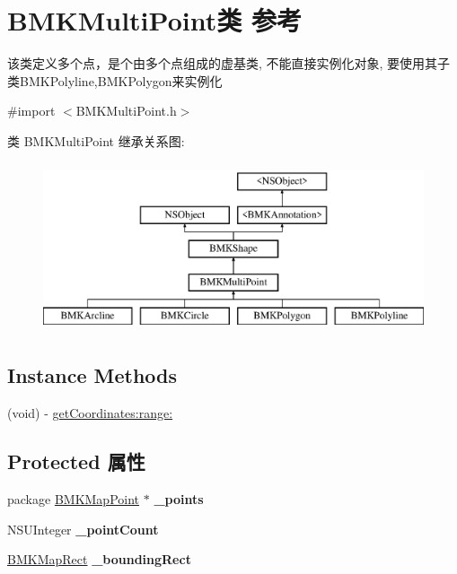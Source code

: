 \hypertarget{interface_b_m_k_multi_point}{\section{B\+M\+K\+Multi\+Point类 参考}
\label{interface_b_m_k_multi_point}
}


该类定义多个点，是个由多个点组成的虚基类, 不能直接实例化对象, 要使用其子类\+B\+M\+K\+Polyline,B\+M\+K\+Polygon来实例化  




{\ttfamily \#import $<$B\+M\+K\+Multi\+Point.\+h$>$}

类 B\+M\+K\+Multi\+Point 继承关系图\+:\begin{figure}[H]
\begin{center}
\leavevmode
\includegraphics[height=5.000000cm]{interface_b_m_k_multi_point}
\end{center}
\end{figure}
\subsection*{Instance Methods}
\begin{DoxyCompactItemize}
\item 
(void) -\/ \hyperlink{interface_b_m_k_multi_point_a5d7b000029db5c7efb2230ccb980bc29}{get\+Coordinates\+:range\+:}
\end{DoxyCompactItemize}
\subsection*{Protected 属性}
\begin{DoxyCompactItemize}
\item 
\hypertarget{interface_b_m_k_multi_point_a736d72334fd2ca7ae2108d9692d1107c}{package \hyperlink{struct_b_m_k_map_point}{B\+M\+K\+Map\+Point} $\ast$ {\bfseries \+\_\+points}}\label{interface_b_m_k_multi_point_a736d72334fd2ca7ae2108d9692d1107c}

\item 
\hypertarget{interface_b_m_k_multi_point_a8cc584110411ad5f72fc5068ae123a32}{N\+S\+U\+Integer {\bfseries \+\_\+point\+Count}}\label{interface_b_m_k_multi_point_a8cc584110411ad5f72fc5068ae123a32}

\item 
\hypertarget{interface_b_m_k_multi_point_a25b2435a2c10b3a22f6e7dc5bd064a52}{\hyperlink{struct_b_m_k_map_rect}{B\+M\+K\+Map\+Rect} {\bfseries \+\_\+bounding\+Rect}}\label{interface_b_m_k_multi_point_a25b2435a2c10b3a22f6e7dc5bd064a52}

\end{DoxyCompactItemize}
